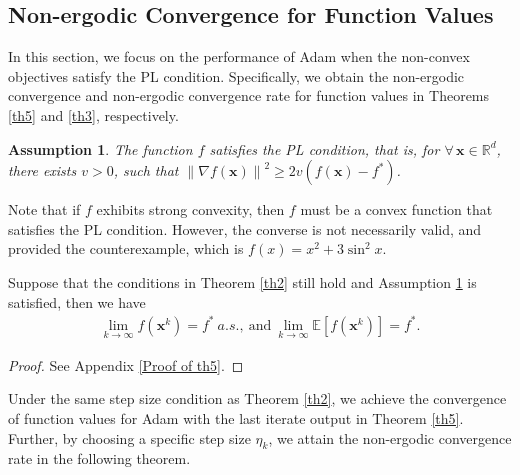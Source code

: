 \documentclass[twoside,11pt]{article}
\newtheorem{assumption}{Assumption}
\begin{document}
\subsection{Non-ergodic Convergence for Function Values}\label{PLErgcor}
In this section, we focus on the performance of Adam when the non-convex objectives satisfy the PL condition. Specifically, we obtain the non-ergodic convergence and non-ergodic convergence rate for function values in Theorems \ref{th5} and \ref{th3}, respectively.

\begin{assumption}\label{Asspl}	
The function $f$ satisfies the PL condition,  that is, for $\forall\,\mathbf{x}\in{\mathbb{R}^d}$, there exists $v>0$, such that $\left\| \nabla f(\mathbf{x})\right\|^2\ge2v(f(\mathbf{x})-f^*)$.
\end{assumption}

\par Note that if $f$ exhibits strong convexity, then $f$ must be a convex function that satisfies the PL condition. However, the converse is not necessarily valid, and \citet{karimi2016linear} provided the counterexample, which is $f(x)=x^{2}+3\sin^{2}x$. 

	
\begin{theorem}\label{th5}
Suppose that the conditions in Theorem \ref{th2} still hold and Assumption  \ref{Asspl} is satisfied, then we have
\begin{equation}
	\begin{aligned}
		\lim_{k\rightarrow\infty} f(\mathbf{x}^k)=f^*\ a.s.,\ 
		\text{and}\ \lim_{k\rightarrow\infty} \mathbb{E}\left[f(\mathbf{x}^k)\right]=f^*.\nonumber
	\end{aligned}
\end{equation}
\end{theorem}
\begin{proof}
See Appendix \ref{Proof of th5}.
\end{proof}
	
\par Under the same step size condition as Theorem \ref{th2}, we achieve the convergence of function values for Adam with the last iterate output in Theorem \ref{th5}. Further, by choosing a specific step size $\eta_{k}$, we attain the non-ergodic convergence rate in the following theorem.
\end{document}
